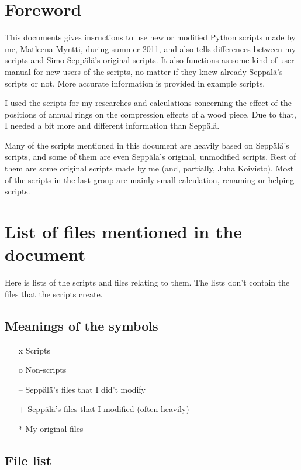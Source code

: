 \documentclass[a4paper]{article}
\begin{document}
\section{Foreword}

This documents gives insructions to use new or modified Python scripts made 
by me, Matleena Myntti, during summer 2011, and also tells differences between 
my scripts and Simo Sepp\"{a}l\"{a}'s original scripts. It also functions as 
some kind of user manual for new users of the scripts, no matter if they knew 
already Sepp\"{a}l\"{a}'s scripts or not. More accurate information is provided 
in example scripts.

I used the scripts for my researches and calculations concerning the effect 
of the positions of annual rings on the compression effects of a wood piece. 
Due to that, I needed a bit more and different information than 
Sepp\"{a}l\"{a}.

Many of the scripts mentioned in this document are heavily based on 
Sepp\"{a}l\"{a}'s scripts, and some of them are even Sepp\"{a}l\"{a}'s original, 
unmodified scripts. Rest of them are some original scripts made by me (and, 
partially, Juha Koivisto). Most of the scripts in the last group are mainly small 
calculation, renaming or helping scripts.

\section{List of files mentioned in the document}

Here is lists of the scripts and files relating to them. The lists don't contain 
the files that the scripts create.

\subsection{Meanings of the symbols}

\begin{itemize}  
\item[x] Scripts
\item[o] Non-scripts
\item[--] Sepp\"{a}l\"{a}'s files that I did't modify
\item[+] Sepp\"{a}l\"{a}'s files that I modified (often heavily)
\item[*] My original files
\end{itemize}

\subsection{File list}
\end{document}
